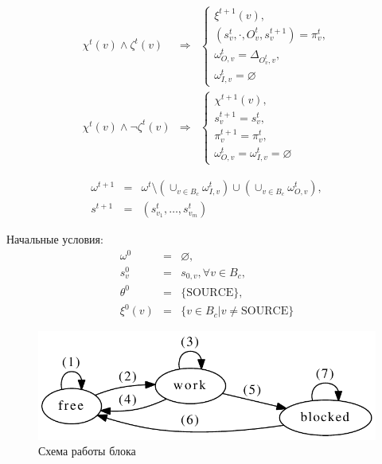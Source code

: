 \documentclass[10pt,a4paper]{article}
\newcommand{\source}{\text{SOURCE}}
\begin{document}
\begin{eqnarray}
  \chi^t(v) \wedge \zeta^t(v) & \Rightarrow &
    \begin{cases}
      \xi^{t + 1}(v), \\
      (s^t_v, \cdot, O^t_v, s^{t + 1}_v) = \pi^t_v, \\
      \omega^t_{O, v} = \Delta_{O^t_v, v}, \\
      \omega^t_{I, v} = \varnothing
    \end{cases} \label{blocktofree} \\
  \chi^t(v) \wedge \neg \zeta^t(v) & \Rightarrow &
    \begin{cases}
      \chi^{t + 1}(v), \\
      s^{t + 1}_v = s^t_v, \\
      \pi^{t + 1}_v = \pi^{t}_v, \\
      \omega^t_{O, v} = \omega^t_{I, v} = \varnothing
    \end{cases} \label{blocktoblock}
\end{eqnarray}

\begin{eqnarray}
  \omega^{t + 1} & = & \omega^t \setminus (\cup_{v \in B_c} \omega^t_{I, v}) \cup (\cup_{v \in B_c} \omega^t_{O, v}) \label{newomega}, \\
  s^{t + 1} & = & (s^t_{v_1}, \dots, s^t_{v_m}) \label{newstate}
\end{eqnarray}

Начальные условия:
\begin{eqnarray}
  \omega^0 & = & \varnothing, \\
  s^0_v & = & s_{0, v}, \forall v \in B_c, \\
  \theta^0 & = & \{\source\}, \\
  \xi^0(v) & = & \{v \in B_c \vert v \neq \source\}
\end{eqnarray}

\begin{figure}
    \centering
    \includegraphics[width=\textwidth]{rules.pdf}
    \caption{Схема работы блока}
    \label{rules}
\end{figure}
\end{document}

